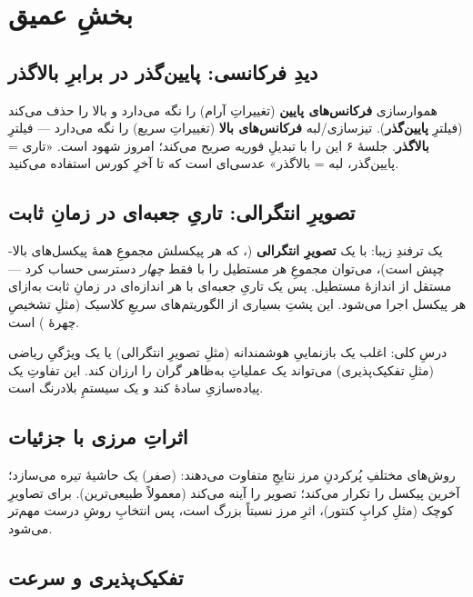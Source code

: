 \documentclass[12pt,a4paper]{article}
\begin{document}
\section{بخشِ عمیق}

\subsection{دیدِ فرکانسی: پایین‌گذر در برابرِ بالاگذر}

هموارسازی \textbf{فرکانس‌های پایین} (تغییراتِ آرام) را نگه می‌دارد و بالا را حذف می‌کند (فیلترِ
\textbf{پایین‌گذر}). تیزسازی/لبه \textbf{فرکانس‌های بالا} (تغییراتِ سریع) را نگه می‌دارد — فیلترِ
\textbf{بالاگذر}. جلسهٔ ۶ این را با تبدیلِ فوریه صریح می‌کند؛ امروز شهود است. «تاری = پایین‌گذر،
لبه = بالاگذر» عدسی‌ای است که تا آخرِ کورس استفاده می‌کنید.

\subsection{تصویرِ انتگرالی: تاریِ جعبه‌ای در زمانِ ثابت}

یک ترفندِ زیبا: با یک \textbf{تصویرِ انتگرالی} (، که هر پیکسلش مجموعِ همهٔ
پیکسل‌های بالا-چپش است)، می‌توان مجموعِ هر مستطیل را با فقط \emph{چهار} دسترسی حساب کرد — مستقل
از اندازهٔ مستطیل. پس یک تاریِ جعبه‌ای با هر اندازه‌ای در زمانِ ثابت به‌ازای هر پیکسل اجرا می‌شود.
این پشتِ بسیاری از الگوریتم‌های سریعِ کلاسیک (مثلِ تشخیصِ چهرهٔ ) است.

\begin{yaddasht}
درسِ کلی: اغلب یک بازنماییِ هوشمندانه (مثلِ تصویرِ انتگرالی) یا یک ویژگیِ ریاضی (مثلِ
تفکیک‌پذیری) می‌تواند یک عملیاتِ به‌ظاهر گران را ارزان کند. این تفاوتِ یک پیاده‌سازیِ سادهٔ کند و
یک سیستمِ بلادرنگ است.
\end{yaddasht}

\subsection{اثراتِ مرزی با جزئیات}

روش‌های مختلفِ پُرکردنِ مرز نتایجِ متفاوت می‌دهند:  (صفر) یک حاشیهٔ تیره می‌سازد؛
 آخرین پیکسل را تکرار می‌کند؛  تصویر را آینه می‌کند (معمولاً طبیعی‌ترین).
برای تصاویرِ کوچک (مثلِ کراپِ کنتور)، اثرِ مرز نسبتاً بزرگ است، پس انتخابِ روشِ درست مهم‌تر می‌شود.

\subsection{تفکیک‌پذیری و سرعت}
\end{document}
